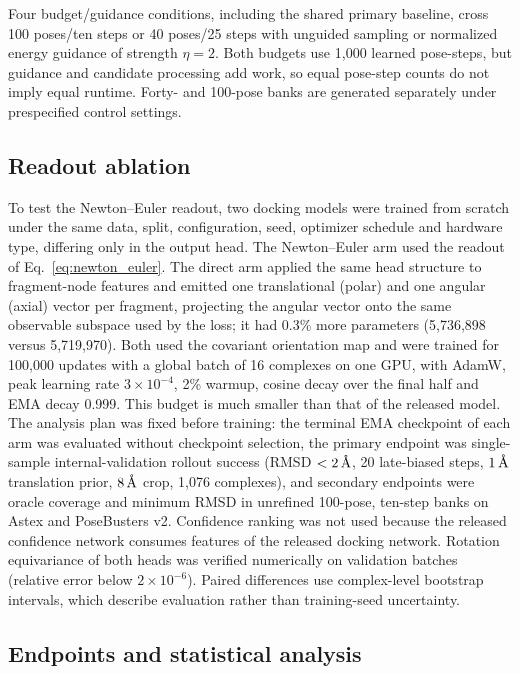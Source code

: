 \documentclass{article}
\newcommand{\angstrom}{\text{\normalfont\AA}}
\begin{document}
Four budget/guidance conditions, including the shared primary baseline, cross 100 poses/ten steps or 40 poses/25 steps with unguided sampling or normalized energy guidance of strength \(\eta=2\). Both budgets use 1,000 learned pose-steps, but guidance and candidate processing add work, so equal pose-step counts do not imply equal runtime. Forty- and 100-pose banks are generated separately under prespecified control settings.

\subsection{Readout ablation}
\label{sec:readout_ablation}

To test the Newton--Euler readout, two docking models were trained from scratch under the same data, split, configuration, seed, optimizer schedule and hardware type, differing only in the output head. The Newton--Euler arm used the readout of Eq.~\eqref{eq:newton_euler}. The direct arm applied the same head structure to fragment-node features and emitted one translational (polar) and one angular (axial) vector per fragment, projecting the angular vector onto the same observable subspace used by the loss; it had 0.3\% more parameters (5,736,898 versus 5,719,970). Both used the covariant orientation map and were trained for 100,000 updates with a global batch of 16 complexes on one GPU, with AdamW, peak learning rate \(3\times10^{-4}\), 2\% warmup, cosine decay over the final half and EMA decay 0.999. This budget is much smaller than that of the released model. The analysis plan was fixed before training: the terminal EMA checkpoint of each arm was evaluated without checkpoint selection, the primary endpoint was single-sample internal-validation rollout success (RMSD \(<2\,\angstrom\), 20 late-biased steps, \(1\,\angstrom\) translation prior, \(8\,\angstrom\) crop, 1,076 complexes), and secondary endpoints were oracle coverage and minimum RMSD in unrefined 100-pose, ten-step banks on Astex and PoseBusters v2. Confidence ranking was not used because the released confidence network consumes features of the released docking network. Rotation equivariance of both heads was verified numerically on validation batches (relative error below \(2\times10^{-6}\)). Paired differences use complex-level bootstrap intervals, which describe evaluation rather than training-seed uncertainty.

\subsection{Endpoints and statistical analysis}
\label{sec:metrics}
\end{document}
